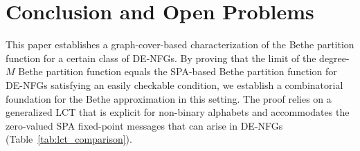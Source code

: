 \documentclass[journal]{IEEEtran}
\newcommand{\add}[1]{{\color{black}#1}}
\begin{document}
\section{Conclusion and Open Problems}
\label{sec: conclusion and open problems}

This paper establishes a graph-cover-based characterization of the Bethe
partition function for a certain class of DE-NFGs. By proving that the limit
of the degree-$M$ Bethe partition function equals the SPA-based Bethe
partition function for DE-NFGs satisfying an easily checkable condition, we
establish a combinatorial foundation for the Bethe approximation in this
setting.  \add{The proof relies on a generalized LCT that is explicit for
  non-binary alphabets and accommodates the zero-valued SPA fixed-point
  messages that can arise in DE-NFGs (Table~\ref{tab:lct_comparison}).}
\end{document}
